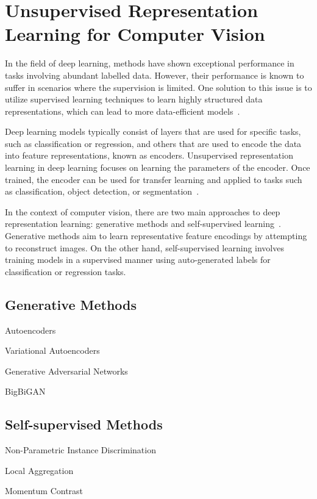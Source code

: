 \section{Unsupervised Representation Learning for Computer Vision}
\label{subsec:unsupervised_representation}
In the field of deep learning, methods have shown exceptional performance in tasks involving abundant labelled data. However, their performance is known to suffer in scenarios where the supervision is limited. One solution to this issue is to utilize supervised learning techniques to learn highly structured data representations, which can lead to more data-efficient models~\citep{lake2015human}.

Deep learning models typically consist of layers that are used for specific tasks, such as classification or regression, and others that are used to encode the data into feature representations, known as encoders. Unsupervised representation learning in deep learning focuses on learning the parameters of the encoder. Once trained, the encoder can be used for transfer learning and applied to tasks such as classification, object detection, or segmentation~\citep{weiss2016survey}.

In the context of computer vision, there are two main approaches to deep representation learning: generative methods and self-supervised learning~\citep{bengio2013representation}. Generative methods aim to learn representative feature encodings by attempting to reconstruct images. On the other hand, self-supervised learning involves training models in a supervised manner using auto-generated labels for classification or regression tasks.

\subsection{Generative Methods}
\label{subsec:generative_methods}
Autoencoders 

Variational Autoencoders

Generative Adversarial Networks

BigBiGAN

\subsection{Self-supervised Methods}
\label{subsec:self_supervised_methods}
Non-Parametric Instance Discrimination

Local Aggregation

Momentum Contrast

